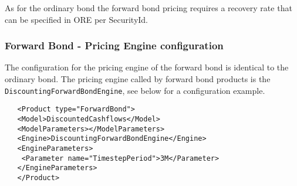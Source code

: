 
As for the ordinary bond the forward bond pricing requires a recovery rate that can be specified in ORE per SecurityId.

\subsubsection*{Forward Bond - Pricing Engine configuration}

The configuration for the pricing engine of the forward bond is identical to the ordinary bond.%
The pricing engine called by forward bond products is the {\tt DiscountingForwardBondEngine}, see below for a configuration example.

   \begin{verbatim}
   <Product type="ForwardBond">
   <Model>DiscountedCashflows</Model>
   <ModelParameters></ModelParameters>
   <Engine>DiscountingForwardBondEngine</Engine>
   <EngineParameters>
    <Parameter name="TimestepPeriod">3M</Parameter>
   </EngineParameters>
   </Product>
   \end{verbatim}
